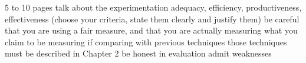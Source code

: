 5 to 10 pages
talk about the experimentation
adequacy, efficiency, productiveness, effectiveness (choose your criteria, state them clearly and justify them)
be careful that you are using a fair measure, and that you are actually measuring what you claim to be measuring
if comparing with previous techniques those techniques must be described in Chapter 2
be honest in evaluation
admit weaknesses